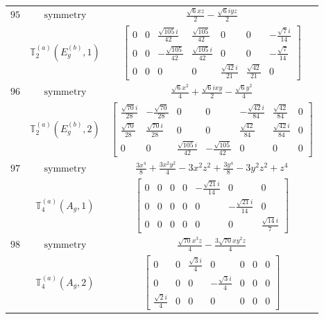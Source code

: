\documentclass[fleqn,8pt,landscape]{jsarticle}
\begin{document}
\begin{longtable}{ccc}
$ 95 $ & $ \text{symmetry} $ & $ \frac{\sqrt{6} x z}{2} - \frac{\sqrt{6} i y z}{2} $ \\
$  $ & $ \mathbb{T}_{2}^{(a)}(E_{g}^{(b)},1) $ & $ \begin{bmatrix} 0 & 0 & \frac{\sqrt{105} i}{42} & \frac{\sqrt{105}}{42} & 0 & 0 & - \frac{\sqrt{7} i}{14} \\ 0 & 0 & - \frac{\sqrt{105}}{42} & \frac{\sqrt{105} i}{42} & 0 & 0 & - \frac{\sqrt{7}}{14} \\ 0 & 0 & 0 & 0 & \frac{\sqrt{42} i}{21} & \frac{\sqrt{42}}{21} & 0 \end{bmatrix} $ \\ \hline
$ 96 $ & $ \text{symmetry} $ & $ \frac{\sqrt{6} x^{2}}{4} + \frac{\sqrt{6} i x y}{2} - \frac{\sqrt{6} y^{2}}{4} $ \\
$  $ & $ \mathbb{T}_{2}^{(a)}(E_{g}^{(b)},2) $ & $ \begin{bmatrix} \frac{\sqrt{70} i}{28} & - \frac{\sqrt{70}}{28} & 0 & 0 & - \frac{\sqrt{42} i}{84} & \frac{\sqrt{42}}{84} & 0 \\ \frac{\sqrt{70}}{28} & \frac{\sqrt{70} i}{28} & 0 & 0 & \frac{\sqrt{42}}{84} & \frac{\sqrt{42} i}{84} & 0 \\ 0 & 0 & \frac{\sqrt{105} i}{42} & - \frac{\sqrt{105}}{42} & 0 & 0 & 0 \end{bmatrix} $ \\ \hline
$ 97 $ & $ \text{symmetry} $ & $ \frac{3 x^{4}}{8} + \frac{3 x^{2} y^{2}}{4} - 3 x^{2} z^{2} + \frac{3 y^{4}}{8} - 3 y^{2} z^{2} + z^{4} $ \\
$  $ & $ \mathbb{T}_{4}^{(a)}(A_{g},1) $ & $ \begin{bmatrix} 0 & 0 & 0 & 0 & - \frac{\sqrt{21} i}{14} & 0 & 0 \\ 0 & 0 & 0 & 0 & 0 & - \frac{\sqrt{21} i}{14} & 0 \\ 0 & 0 & 0 & 0 & 0 & 0 & \frac{\sqrt{14} i}{7} \end{bmatrix} $ \\ \hline
$ 98 $ & $ \text{symmetry} $ & $ \frac{\sqrt{70} x^{3} z}{4} - \frac{3 \sqrt{70} x y^{2} z}{4} $ \\
$  $ & $ \mathbb{T}_{4}^{(a)}(A_{g},2) $ & $ \begin{bmatrix} 0 & 0 & \frac{\sqrt{3} i}{4} & 0 & 0 & 0 & 0 \\ 0 & 0 & 0 & - \frac{\sqrt{3} i}{4} & 0 & 0 & 0 \\ \frac{\sqrt{2} i}{4} & 0 & 0 & 0 & 0 & 0 & 0 \end{bmatrix} $ \\ \hline

\end{longtable}
\end{document}
